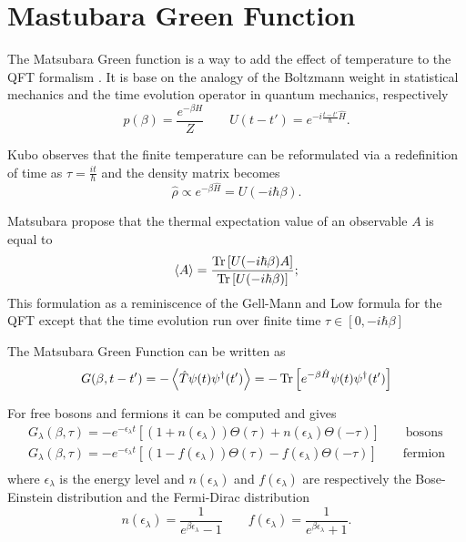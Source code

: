 \chapter{Mastubara Green Function} \label{Appendix_B}

The Matsubara Green function is a way to add the effect of temperature to the QFT formalism \cite{Coleman_2015}.
It is base on the analogy of the Boltzmann weight in statistical mechanics and the time evolution operator in quantum mechanics, respectively 
\begin{equation}
    p(\beta) = \frac{e^{-\beta H}}{Z} \qquad U(t-t') = e^{-i\frac{t-t'}{\hbar}\hat H} .
\end{equation}

Kubo observes that the finite temperature can be reformulated via a redefinition of time as $\tau = \frac{it}{\hbar}$ and the density matrix becomes 
\begin{equation}
    \hat \rho \propto e^{-\beta \hat H} = U(-i\hbar \beta).
\end{equation}

Matsubara propose that the thermal expectation value of an observable $A$ is equal to 
\begin{equation}
    \left<A\right> = \frac{\operatorname{Tr} \left[U(-i\hbar \beta)A\right]}{\operatorname{Tr}\left[U(-i\hbar \beta)\right]};
\end{equation}
This formulation as a reminiscence of the Gell-Mann and Low formula for the QFT except that the time evolution run over finite time $\tau \in \left[0,-i\hbar\beta\right]$

The Matsubara Green Function can be written as 
\begin{equation}
    G(\beta, t-t') = - \left< \hat T \psi(t)\psi^\dagger(t') \right> = -\operatorname{Tr}\left[e^{-\beta\hat H} \psi(t)\psi^\dagger(t') \right]
\end{equation}

For free bosons and fermions it can be computed and gives \cite{Coleman_2015}
\begin{equation}
    \begin{split}
        G_{\lambda}(\beta, \tau) = -e^{-\epsilon_\lambda t}\left[(1+n(\epsilon_\lambda))\Theta(\tau)+n(\epsilon_\lambda)\Theta(-\tau)\right] \qquad \mathrm{bosons}\\
        G_{\lambda}(\beta, \tau) = -e^{-\epsilon_\lambda t}\left[(1-f(\epsilon_\lambda))\Theta(\tau)-f(\epsilon_\lambda)\Theta(-\tau)\right] \qquad \mathrm{fermion}\\
    \end{split}
\end{equation}
where $\epsilon_\lambda$ is the energy level and $n(\epsilon_\lambda)$ and $f(\epsilon_\lambda)$ are respectively the Bose-Einstein distribution and the Fermi-Dirac distribution
\begin{equation}
    n(\epsilon_\lambda) = \frac{1}{e^{\beta\epsilon_\lambda} - 1} \qquad f(\epsilon_\lambda) = \frac{1}{e^{\beta\epsilon_\lambda} + 1}.
\end{equation}

